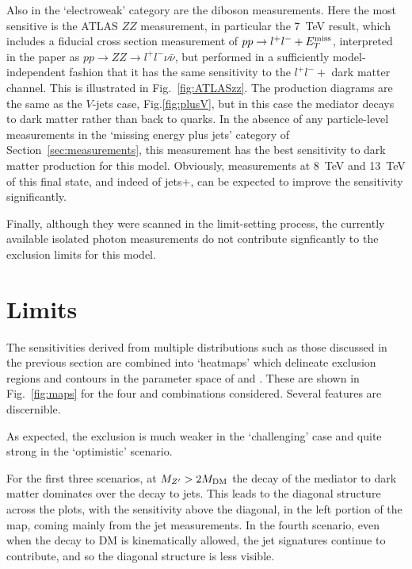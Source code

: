 \documentclass[floatfix]{article}
\begin{document}
Also in the `electroweak' category are the diboson measurements. Here the most sensitive is the ATLAS $ZZ$ measurement, in particular the 7~TeV result, which includes
a fiducial cross section measurement of $pp \rightarrow l^+l^- + E_T^{\rm miss}$, interpreted in the paper as $pp \rightarrow ZZ \rightarrow l^+l^- \nu \bar{\nu}$, but performed in a 
sufficiently model-independent fashion that it has the same sensitivity to the $l^+l^- +$ dark matter channel. This is illustrated in Fig.~\ref{fig:ATLASzz}. 
The production diagrams are the same as the $V$-jets case, Fig.\ref{fig:plusV}, but in this case the 
mediator decays to dark matter rather than back to quarks. 
In the absence of any particle-level measurements in the `missing energy plus jets' category of 
Section~\ref{sec:measurements}, this measurement has the best sensitivity to dark matter production for this model. Obviously, measurements at 8~TeV and 13~TeV of this 
final state, and indeed of jets+\MET, can be expected to improve the sensitivity significantly.

Finally, although they were scanned in the limit-setting process, the currently available isolated photon measurements do not contribute signficantly to the exclusion
limits for this model.

\section{Limits}\label{sec:limits}

The sensitivities derived from multiple distributions such as those discussed in the previous section are combined into `heatmaps' which delineate exclusion 
regions and contours in the parameter space of \MDM and \MZP. These are shown in Fig.~\ref{fig:maps} for the four \GQ and \GDM combinations considered.
Several features are discernible. 

As expected, the exclusion is much weaker in the `challenging' case and quite strong in the `optimistic' scenario.

For the first three scenarios, at $M_{Z^{\prime}} > 2M_{\rm DM}$ the decay of the mediator to dark matter dominates over the decay to jets. This leads to the diagonal structure across the plots, 
with the sensitivity above the diagonal, in the left portion of the map, coming mainly from the jet measurements. In the fourth scenario, even when the decay to
DM is kinematically allowed, the jet signatures continue to contribute, and so the diagonal structure is less visible. 
\end{document}
